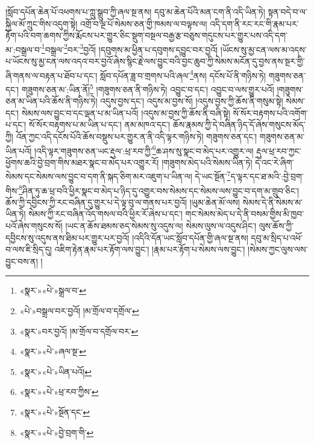 །སློབ་དཔོན་ཆེན་པོ་འཕགས་པ་ཀླུ་སྒྲུབ་ཀྱི་ཞལ་སྔ་ནས། དབུ་མ་ཆེན་པོའི་མན་ངག་ནི་འདི་ཡིན་ཏེ། སྟན་བདེ་བ་ལ་སྐྱིལ་མོ་ཀྲུང་གིས་འདུག་སྟེ། འགྲོ་བ་ལྔ་པོ་སེམས་ཅན་གྱི་ཁམས་ལ་བལྟས་ལ། འདི་དག་ནི་རང་རང་གི་རྣམ་པར་རྟོག་པའི་བག་ཆགས་ཀྱིས་རྨོངས་པར་གྱུར་ཅིང་སྡུག་བསྔལ་བརྒྱ་རྩ་བཅུས་གདུངས་པར་གྱུར་པས་འདི་དག་མ་:བསྒྲལ་བ་\footnote{«སྣར་»«པེ་»སྒྲལ་བ་}བསྒྲལ་\footnote{«པེ་»བསྒྲལ་བར་བྱའོ། །མ་གྲོལ་བ་དགྲོལ་}བར་\footnote{«སྣར་»བར་བྱའོ། །མ་གྲོལ་བ་དགྲོལ་བར་}བྱའོ། །དབུགས་མ་ཕྱིན་པ་དབུགས་དབྱུང་བར་བྱའོ། །ཡོངས་སུ་མྱ་ངན་ལས་མ་འདས་པ་ཡོངས་སུ་མྱ་ངན་ལས་འདའ་བར་བྱའོ་ཞེས་སྙིང་རྗེ་ལས་བྱུང་བའི་བྱང་ཆུབ་ཀྱི་སེམས་མངོན་དུ་བྱས་ནས་སྔར་གྱི་ཞི་གནས་ལ་བརྟན་པ་ཐོབ་པ་དང་། སློབ་དཔོན་ཟླ་བ་གྲགས་པའི་ཞལ་\footnote{«སྣར་»«པེ་»ཞལ་སྔ་}ནས། དངོས་པོ་ནི་གཉིས་ཏེ། གཟུགས་ཅན་དང་། གཟུགས་ཅན་མ་:ཡིན་ནོ།\footnote{«སྣར་»«པེ་»ཡིན་པའོ།} །གཟུགས་ཅན་ནི་གཉིས་ཏེ། འབྱུང་བ་དང་། འབྱུང་བ་ལས་གྱུར་པའོ། །གཟུགས་ཅན་མ་ཡིན་པའི་ཆོས་ནི་གཉིས་ཏེ། འདུས་བྱས་དང་། འདུས་མ་བྱས་སོ། །འདུས་བྱས་ཀྱི་ཆོས་ནི་གསུམ་སྟེ། སེམས་དང་། སེམས་ལས་བྱུང་བ་དང་ལྡན་པ་མ་ཡིན་པའོ། །འདུས་མ་བྱས་ཀྱི་ཆོས་ནི་བཞི་སྟེ། སོ་སོར་བརྟགས་པའི་འགོག་པ་དང་། སོ་སོར་བརྟགས་པ་མ་ཡིན་པ་དང་། ནམ་མཁའ་དང་། ཆོས་རྣམས་ཀྱི་དེ་བཞིན་ཉིད་དོ་ཞེས་གསུངས་མོད་ཀྱི། འོན་ཀྱང་འདི་དངོས་པོའི་ཆོས་བསྡུས་པར་གྱུར་ན་ནི་འདི་ལྟར་གཉིས་ཏེ། གཟུགས་ཅན་དང་། གཟུགས་ཅན་མ་ཡིན་པའོ། །འདི་ལྟར་གཟུགས་ཅན་ཡང་རྡུལ་:ཕྲ་རབ་ཀྱི་\footnote{«སྣར་»«པེ་»ཕྲ་རབ་ཀྱིས་}ཆ་ཤས་སུ་སྣང་བ་མེད་པར་འགྱུར་ལ། རྡུལ་ཕྲ་རབ་ཀྱང་ཕྱོགས་ཆའི་བྱེ་བྲག་གིས་མཐར་སྣང་བ་མེད་པར་འགྱུར་རོ། །གཟུགས་མེད་པའི་སེམས་ཡིན་ཏེ། དེ་འང་རེ་ཞིག་སེམས་དང་སེམས་ལས་བྱུང་བ་དག་ནི་སྐད་ཅིག་མར་འཇུག་པ་ཡིན་ལ། དེ་ཡང་སྔོན་\footnote{«སྣར་»«པེ་»སྔོན་དང་}ད་ལྟར་དང་ཐ་མའི་:བྱེ་བྲག་གིས་\footnote{«སྣར་»«པེ་»བྱེ་བྲག་གི་}ཤིན་ཏུ་ཆ་ཕྲ་བའི་ཕྱིར་སྣང་བ་མེད་པ་ཉིད་དུ་འགྱུར་བས་སེམས་དང་སེམས་ལས་བྱུང་བ་དག་མ་གྲུབ་ཅིང་། ཆོས་ཀྱི་དབྱིངས་ཀྱི་རང་བཞིན་དུ་གྱུར་པ་དེ་ལྟ་བུ་ལ་གནས་པར་བྱའོ། །ཡུམ་ཆེན་མོ་ལས། སེམས་དེ་ནི་སེམས་མ་ཡིན་ཏེ། སེམས་ཀྱི་རང་བཞིན་འོད་གསལ་བའི་ཕྱིར་རོ་ཞེས་པ་དང་། གང་སེམས་མེད་པ་དེ་ནི་བསམ་གྱིས་མི་ཁྱབ་པའོ་ཞེས་གསུངས་སོ། །ཡང་ན་ཆོས་ཐམས་ཅད་སེམས་སུ་འདུས་ལ། སེམས་ལུས་ལ་འདུས་ཤིང་། ལུས་ཆོས་ཀྱི་དབྱིངས་སུ་འདུས་ནས་ཐིམ་པར་གྱུར་པར་བྱའོ། །འདིའི་དོན་ཡང་སློབ་དཔོན་གྱི་ཞལ་སྔ་ནས། དབུ་མ་སྲིད་པ་འཕོ་བ་ལས་ཇི་སྲིད་དུ། འཇིག་རྟེན་རྣམ་པར་རྟོག་ལས་བྱུང་། །རྣམ་པར་རྟོག་པ་སེམས་ལས་བྱུང་། །སེམས་ཀྱང་ལུས་ལས་བྱུང་བས་ན། །
